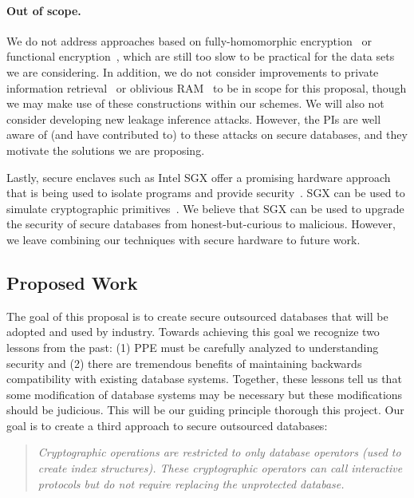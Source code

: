 \paragraph{Out of scope.} We do not address approaches based on
fully-homomorphic encryption~\cite{STOC:Gentry09} or functional
encryption~\cite{FOCS:GGHRSW13}, which are still too slow to be
practical for the data sets we are considering.
In addition, we do not
consider improvements to private information
retrieval~\cite{FOCS:CGKS95} or oblivious
RAM~\cite{STOC:Goldreich87,goldreich1996software} to be in scope for
this proposal, though we may make use of these constructions within our
schemes.
We will also not consider developing new leakage inference attacks.
However, the PIs are well aware of (and have contributed to) to these attacks on
secure databases, and they motivate the solutions we are
proposing.

Lastly, secure enclaves such as Intel SGX offer a promising hardware approach that is being used to isolate programs and provide security~\cite{EPRINT:CosDev16}.  SGX can be used to simulate cryptographic primitives~\cite{EPRINT:SasGorFle17,EPRINT:FVBG16}.  We believe that SGX can be used to upgrade the security of secure databases from honest-but-curious to malicious.  However, we leave combining our techniques with secure hardware to future work.


\subsection{Proposed Work}
The goal of this proposal is to create secure outsourced databases that
will be adopted and used by industry.  Towards achieving this goal we
recognize two lessons from the past: (1) PPE must be carefully analyzed
to understanding security and (2) there are tremendous benefits of
maintaining backwards compatibility with existing database systems.
Together, these lessons tell us that some modification of database
systems may be necessary but these modifications should be judicious.
This will be our guiding principle thorough this project.  Our goal is to create a third approach to secure outsourced databases: 
\begin{quote}\emph{Cryptographic operations are restricted to only
database operators (used to create index structures).  These
cryptographic operators can call interactive protocols but do not
require replacing the unprotected database. }
\end{quote}

